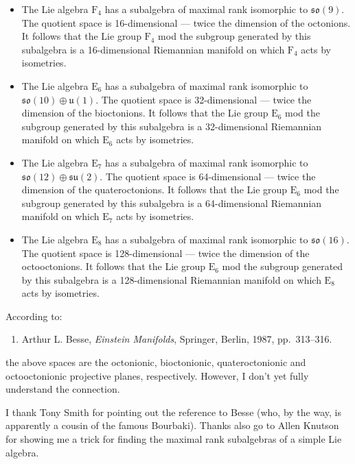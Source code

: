 \documentclass{article}
\def\tightlist{}
\begin{document}
\begin{itemize}
\tightlist
\item
  The Lie algebra \(\mathrm{F}_4\) has a subalgebra of maximal rank
  isomorphic to \(\mathfrak{so}(9)\). The quotient space is
  16-dimensional --- twice the dimension of the octonions. It follows
  that the Lie group \(\mathrm{F}_4\) mod the subgroup generated by this
  subalgebra is a 16-dimensional Riemannian manifold on which
  \(\mathrm{F}_4\) acts by isometries.
\item
  The Lie algebra \(\mathrm{E}_6\) has a subalgebra of maximal rank
  isomorphic to \(\mathfrak{so}(10)\oplus\mathfrak{u}(1)\). The quotient
  space is 32-dimensional --- twice the dimension of the bioctonions. It
  follows that the Lie group \(\mathrm{E}_6\) mod the subgroup generated
  by this subalgebra is a 32-dimensional Riemannian manifold on which
  \(\mathrm{E}_6\) acts by isometries.
\item
  The Lie algebra \(\mathrm{E}_7\) has a subalgebra of maximal rank
  isomorphic to \(\mathfrak{so}(12)\oplus\mathfrak{su}(2)\). The
  quotient space is 64-dimensional --- twice the dimension of the
  quateroctonions. It follows that the Lie group \(\mathrm{E}_6\) mod
  the subgroup generated by this subalgebra is a 64-dimensional
  Riemannian manifold on which \(\mathrm{E}_7\) acts by isometries.
\item
  The Lie algebra \(\mathrm{E}_8\) has a subalgebra of maximal rank
  isomorphic to \(\mathfrak{so}(16)\). The quotient space is
  128-dimensional --- twice the dimension of the octooctonions. It
  follows that the Lie group \(\mathrm{E}_6\) mod the subgroup generated
  by this subalgebra is a 128-dimensional Riemannian manifold on which
  \(\mathrm{E}_8\) acts by isometries.
\end{itemize}

According to:

\begin{enumerate}
\def\labelenumi{\arabic{enumi})}
\setcounter{enumi}{5}
\tightlist
\item
  Arthur L. Besse, \emph{Einstein Manifolds}, Springer, Berlin, 1987,
  pp.~313--316.
\end{enumerate}

the above spaces are the octonionic, bioctonionic, quateroctonionic and
octooctonionic projective planes, respectively. However, I don't yet
fully understand the connection.

I thank Tony Smith for pointing out the reference to Besse (who, by the
way, is apparently a cousin of the famous Bourbaki). Thanks also go to
Allen Knutson for showing me a trick for finding the maximal rank
subalgebras of a simple Lie algebra.
\end{document}

